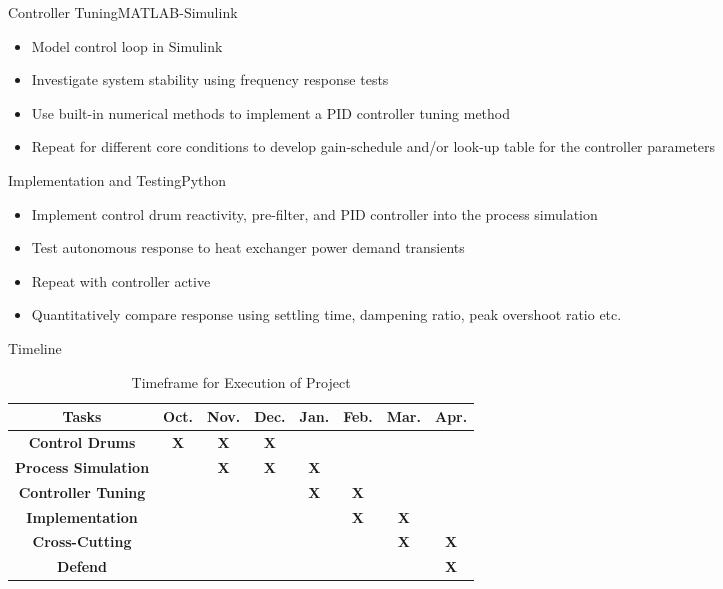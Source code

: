 \documentclass[aspectratio=1610,pdftex,dvipsnames]{beamer}
\newcommand{\x}{\cellcolor{lightgray}\textbf{X}} %
\begin{document}
\begin{frame}{Controller Tuning}{MATLAB-Simulink}
    \begin{itemize}
        \item Model control loop in Simulink
        \item Investigate system stability using frequency response tests
        \item Use built-in numerical methods to implement a PID controller tuning method
        \item Repeat for different core conditions to develop gain-schedule and/or look-up table for the controller parameters
    \end{itemize}
\end{frame}

\begin{frame}{Implementation and Testing}{Python}
    \begin{itemize}
        \item Implement control drum reactivity, pre-filter, and PID controller into the process simulation
        \item Test autonomous response to heat exchanger power demand transients
        \item Repeat with controller active
        \item Quantitatively compare response using settling time, dampening ratio, peak overshoot ratio etc.
    \end{itemize}
\end{frame}

\begin{frame}{Timeline}

    \begin{table}
        \centering
        \caption{Timeframe for Execution of Project}
        \begin{tabular}{c|c|c|c|c|c|c|c}
            \textbf{Tasks} & Oct. & Nov. & Dec. & Jan. & Feb. & Mar. & Apr.\\\hline
            \textbf{Control Drums} & \x & \x & \x &  &  &  & \\\hline
            \textbf{Process Simulation} &  & \x & \x & \x &  &  & \\\hline
            \textbf{Controller Tuning} &  &  &  & \x & \x &  & \\\hline
            \textbf{Implementation} &  &  &  &  & \x & \x & \\\hline
            \textbf{Cross-Cutting} &  &  &  &  &  & \x & \x\\\hline
            \textbf{Defend} &  &  &  &  &  &  & \x \\

        \end{tabular}
    \end{table}
        

\end{frame}
\end{document}
